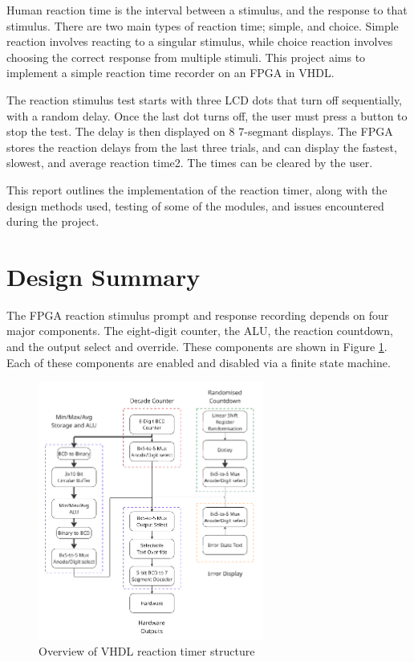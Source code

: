 \documentclass[11pt]{article}
\begin{document}
Human reaction time is the interval between a stimulus, and the response to that stimulus. There are two main types of reaction time; simple, and choice. Simple reaction involves reacting to a singular stimulus, while choice reaction involves choosing the correct response from multiple stimuli. This project aims to implement a simple reaction time recorder on an FPGA in VHDL.

The reaction stimulus test starts with three LCD dots that turn off sequentially, with a random delay. Once the last dot turns off, the user must press a button to stop the test. The delay is then displayed on 8 7-segmant displays. The FPGA stores the reaction delays from the last three trials, and can display the fastest, slowest, and average reaction time2. The times can be cleared by the user.

This report outlines the implementation of the reaction timer, along with the design methods used, testing of some of the modules, and issues encountered during the project.

\section{Design Summary}

The FPGA reaction stimulus prompt and response recording depends on four major components. The eight-digit counter, the ALU, the reaction countdown, and the output select and override. These components are shown in Figure \ref{project_structure}. Each of these components are enabled and disabled via a finite state machine.

\begin{figure}[H]
  \centering
  \includegraphics[width=0.66\textwidth]{project_overall_structure.png}
  \caption{Overview of VHDL reaction timer structure}
  \label{project_structure}
\end{figure}
\end{document}
